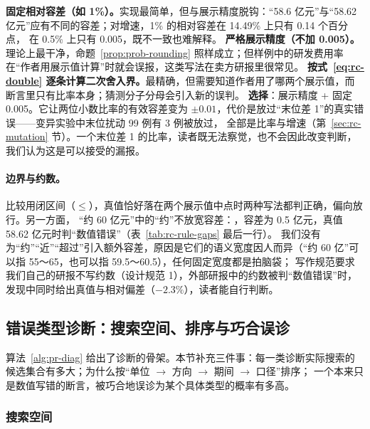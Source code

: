 \begin{tradeoff}[：容差取多宽]
\textbf{固定相对容差（如 1\%）。}实现最简单，但与展示精度脱钩：“58.6 亿元”与“58.62 亿元”应有不同的容差；对增速，1\% 的相对容差在 14.49\% 上只有 0.14 个百分点，
在 0.5\% 上只有 0.005，既不一致也难解释。
\textbf{严格展示精度（不加 0.005）。}理论上最干净，命题~\ref{prop:prob-rounding} 照样成立；但样例中的研发费用率在“作者用展示值计算”时就会误报，这类写法在卖方研报里很常见。
\textbf{按式~\eqref{eq:rc-double} 逐条计算二次舍入界。}最精确，但需要知道作者用了哪两个展示值，而断言里只有比率本身；猜测分子分母会引入新的误判。
\textbf{选择}：展示精度 + 固定 0.005。它让两位小数比率的有效容差变为 $\pm0.01$，代价是放过“末位差 1”的真实错误——变异实验中末位扰动 99 例有 3 例被放过，
全部是比率与增速（第~\ref{sec:rc-mutation} 节）。一个末位差 1 的比率，读者既无法察觉，也不会因此改变判断，我们认为这是可以接受的漏报。
\end{tradeoff}

\paragraph{边界与约数。}比较用闭区间（$\le$），真值恰好落在两个展示值中点时两种写法都判正确，偏向放行。另一方面，
“约 60 亿元”中的“约”不放宽容差：，容差为 0.5 亿元，真值 58.62 亿元时判“数值错误”（表~\ref{tab:rc-rule-gaps} 最后一行）。
我们没有为“约”“近”“超过”引入额外容差，原因是它们的语义宽度因人而异（“约 60 亿”可以指 55～65，也可以指 59.5～60.5），任何固定宽度都是拍脑袋；
写作规范要求我们自己的研报不写约数（设计规范 1），外部研报中的约数被判“数值错误”时，发现中同时给出真值与相对偏差（$-2.3\%$），读者能自行判断。

\subsection{错误类型诊断：搜索空间、排序与巧合误诊}
\label{sec:rc-diag}

算法~\ref{alg:pr-diag} 给出了诊断的骨架。本节补充三件事：每一类诊断实际搜索的候选集合有多大；为什么按“单位 $\to$ 方向 $\to$ 期间 $\to$ 口径”排序；
一个本来只是数值写错的断言，被巧合地误诊为某个具体类型的概率有多高。

\subsubsection{搜索空间}

